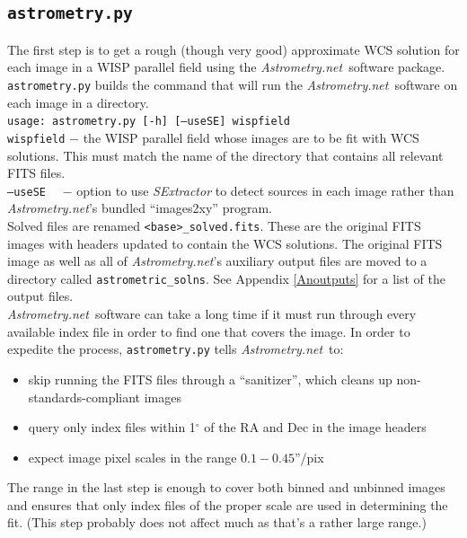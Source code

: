 \documentclass{article}
\newlength{\wideitemsep}
\let\olditem\item
\renewcommand{\item}{\setlength{\itemsep}{\wideitemsep}\olditem}
\newcommand{\An}{\textit{Astrometry.net}}
\begin{document}
\subsection{\texttt{astrometry.py}}
The first step is to get a rough (though very good) approximate WCS 
solution for each image in a WISP parallel field using the \An~software 
package. \texttt{astrometry.py} builds the command that will
run the \An~software on each image in a directory. \\

\texttt{usage: astrometry.py [-h] [--useSE] wispfield} \\

\texttt{wispfield} $-$ \hangindent=2.7cm the WISP parallel field whose images
are to be fit with WCS solutions. This must match the name of the directory that
contains all relevant FITS files.\\

\texttt{--useSE} ~~$-$ \hangindent=2.7cm option to use \textit{SExtractor} 
to detect sources in each image rather than \An's bundled ``images2xy'' 
program. \\

\noindent Solved files are renamed \texttt{<base>\_solved.fits}. These 
are the original FITS images with headers updated to contain the WCS
solutions. 
The original FITS image as well as all of \An's auxiliary
output files are moved to a directory called \texttt{astrometric\_solns}.
See Appendix \ref{Anoutputs} for a list of the output files. \\

\noindent \An~software can take a long time if it must run 
through every available index file in order to find one that covers the
image. In order to expedite the process, \texttt{astrometry.py} tells \An~to:
\begin{itemize}
    \item skip running the FITS files through a ``sanitizer'', which cleans up
    non-standards-compliant images
    \item query only index files within 1$^{\circ}$ of the RA and Dec in the 
    image headers
    \item expect image pixel scales in the range $0.1 - 0.45$''/pix 
\end{itemize}
The range in the last step is enough to cover both binned and unbinned images
and ensures that only index files of the proper scale are used in 
determining the fit. (This step probably does not affect much as
that's a rather large range.) \\
\end{document}
